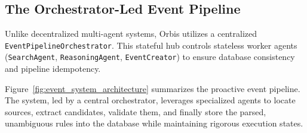 \documentclass[a4paper,12pt]{article}
\begin{document}
\subsection{The Orchestrator-Led Event Pipeline}
Unlike decentralized multi-agent systems, Orbis utilizes a centralized \texttt{EventPipelineOrchestrator}. This stateful hub controls stateless worker agents (\texttt{SearchAgent}, \texttt{ReasoningAgent}, \texttt{EventCreator}) to ensure database consistency and pipeline idempotency.

Figure~\ref{fig:event_system_architecture} summarizes the proactive event pipeline. The system, led by a central orchestrator, leverages specialized agents to locate sources, extract candidates, validate them, and finally store the parsed, unambiguous rules into the database while maintaining rigorous execution states.
\end{document}
